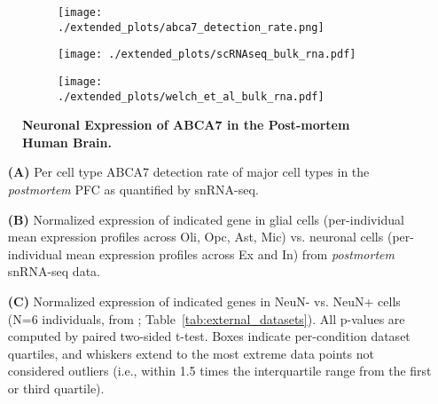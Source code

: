 \begin{figure}[H]
    \begin{subfigure}[t]{.25\textwidth}
        \caption{}
        \texttt{[image: ./extended\_plots/abca7\_detection\_rate.png]}        
    \end{subfigure}
    \par
    \begin{subfigure}[t]{\textwidth}
        \caption{}
        \texttt{[image: ./extended\_plots/scRNAseq\_bulk\_rna.pdf]}        
    \end{subfigure}
    \par
    \begin{subfigure}[t]{\textwidth}
        \caption{}
        \texttt{[image: ./extended\_plots/welch\_et\_al\_bulk\_rna.pdf]}        
    \end{subfigure}
    \caption{
        \textbf{Neuronal Expression of ABCA7 in the Post-mortem Human Brain.}\\
    }
    \label{fig:abca7_expression}
\end{figure}
\begin{itemize}
    \item[\textbf{(A)}] Per cell type ABCA7 detection rate of major cell types in the \textit{postmortem} PFC as quantified by snRNA-seq. 
    \item[\textbf{(B)}] Normalized expression of indicated gene in glial cells (per-individual mean expression profiles across Oli, Opc, Ast, Mic) vs. neuronal cells (per-individual mean expression profiles across Ex and In) from \textit{postmortem} snRNA-seq data. 
    \item[\textbf{(C)}] Normalized expression of indicated genes in NeuN- vs. NeuN+ cells (N=6 individuals, from \cite{Welch2022-aa}; Table~\ref{tab:external_datasets}). All p-values are computed by paired two-sided t-test. Boxes indicate per-condition dataset quartiles, and whiskers extend to the most extreme data points not considered outliers (i.e., within 1.5 times the interquartile range from the first or third quartile).
\end{itemize}